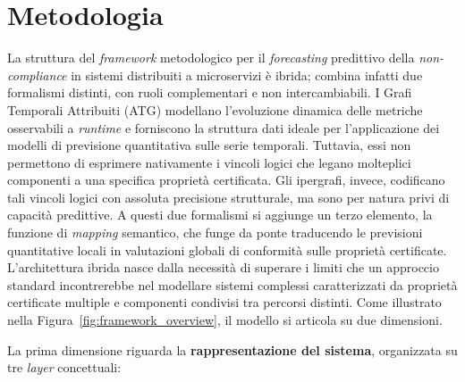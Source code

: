 
\chapter{Metodologia}
\label{chap:metodologia}

La struttura del \textit{framework} metodologico per il \textit{forecasting} predittivo della
\textit{non-compliance} in sistemi distribuiti a microservizi è ibrida; combina infatti due
formalismi distinti, con ruoli complementari e non intercambiabili. I Grafi Temporali
Attribuiti (\gls{ATG}) modellano l'evoluzione dinamica delle metriche osservabili a
\textit{runtime} e forniscono la struttura dati ideale per l'applicazione dei modelli di
previsione quantitativa sulle serie temporali. Tuttavia, essi non permettono di esprimere
nativamente i vincoli logici che legano molteplici componenti a una specifica proprietà
certificata. Gli ipergrafi, invece, codificano tali vincoli logici con assoluta precisione
strutturale, ma sono per natura privi di capacità predittive. A questi due formalismi si
aggiunge un terzo elemento, la funzione di \textit{mapping} semantico, che funge da ponte
traducendo le previsioni quantitative locali in valutazioni globali di conformità sulle
proprietà certificate. 
L'architettura ibrida nasce dalla necessità di superare i limiti che un approccio standard
incontrerebbe nel modellare sistemi complessi caratterizzati da proprietà certificate multiple e
componenti condivisi tra percorsi distinti. Come illustrato nella Figura~\ref{fig:framework_overview},
il modello si articola su due dimensioni.

La prima dimensione riguarda la \textbf{rappresentazione del sistema}, organizzata su tre
\textit{layer} concettuali:

